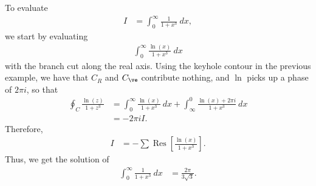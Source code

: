 \documentclass[10pt]{mypackage}
\DeclareMathOperator{\res}{Res}
\begin{document}
   \begin{example}
     To evaluate
     \begin{align*}
       I &= \int_{0}^{\infty} \frac{1}{1 + x^3}\:dx,
     \end{align*}
     we start by evaluating
     \begin{align*}
       \int_{0}^{\infty} \frac{\ln(x)}{1 + x^3}\:dx
     \end{align*}
     with the branch cut along the real axis. Using the keyhole contour in the previous example, we have that $C_R$ and $C_{\ve}$ contribute nothing, and $\ln$ picks up a phase of $2\pi i$, so that
     \begin{align*}
       \oint_{C} \frac{\ln(z)}{1 + z^3} &= \int_{0}^{\infty} \frac{\ln(x)}{1 + x^3}\:dx + \int_{\infty}^{0} \frac{\ln(x) + 2\pi i}{1 + x^3}\:dx\\
                                        &= -2\pi i I.
     \end{align*}
     Therefore, 
     \begin{align*}
       I &= -\sum\res \left[ \frac{\ln(x)}{1 + x^3} \right].
     \end{align*}
     Thus, we get the solution of
     \begin{align*}
       \int_{0}^{\infty} \frac{1}{1 + x^3}\:dx &= \frac{2\pi}{3\sqrt{3}}.
     \end{align*}
   \end{example}
\end{document}
